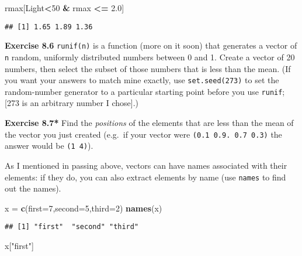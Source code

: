 \documentclass[11pt,]{article}
\newenvironment{Shaded}{\begin{snugshade}}{\end{snugshade}}
\newcommand{\KeywordTok}[1]{\textcolor[rgb]{0.13,0.29,0.53}{\textbf{#1}}}
\newcommand{\DataTypeTok}[1]{\textcolor[rgb]{0.13,0.29,0.53}{#1}}
\newcommand{\DecValTok}[1]{\textcolor[rgb]{0.00,0.00,0.81}{#1}}
\newcommand{\FloatTok}[1]{\textcolor[rgb]{0.00,0.00,0.81}{#1}}
\newcommand{\StringTok}[1]{\textcolor[rgb]{0.31,0.60,0.02}{#1}}
\newcommand{\OperatorTok}[1]{\textcolor[rgb]{0.81,0.36,0.00}{\textbf{#1}}}
\newcommand{\NormalTok}[1]{#1}
\begin{document}
\begin{Shaded}
\begin{Highlighting}[]
\NormalTok{rmax[Light}\OperatorTok{<}\DecValTok{50} \OperatorTok{&}\StringTok{ }\NormalTok{rmax }\OperatorTok{<=}\StringTok{ }\FloatTok{2.0}\NormalTok{]}
\end{Highlighting}
\end{Shaded}

\begin{verbatim}
## [1] 1.65 1.89 1.36
\end{verbatim}

\textbf{Exercise 8.6} \texttt{runif(n)} is a function (more on it soon)
that generates a vector of \texttt{n} random, uniformly distributed
numbers between 0 and 1. Create a vector of 20 numbers, then select the
subset of those numbers that is less than the mean. (If you want your
answers to match mine exactly, use \texttt{set.seed(273)} to set the
random-number generator to a particular starting point before you use
\texttt{runif}; {[}273 is an arbitrary number I chose{]}.)

\textbf{Exercise 8.7* } Find the \emph{positions} of the elements that
are less than the mean of the vector you just created (e.g.~if your
vector were \texttt{(0.1\ 0.9.\ 0.7\ 0.3)} the answer would be
\texttt{(1\ 4)}).

As I mentioned in passing above, vectors can have names associated with
their elements: if they do, you can also extract elements by name (use
\texttt{names} to find out the names).

\begin{Shaded}
\begin{Highlighting}[]
\NormalTok{x =}\StringTok{ }\KeywordTok{c}\NormalTok{(}\DataTypeTok{first=}\DecValTok{7}\NormalTok{,}\DataTypeTok{second=}\DecValTok{5}\NormalTok{,}\DataTypeTok{third=}\DecValTok{2}\NormalTok{)}
\KeywordTok{names}\NormalTok{(x)}
\end{Highlighting}
\end{Shaded}

\begin{verbatim}
## [1] "first"  "second" "third"
\end{verbatim}

\begin{Shaded}
\begin{Highlighting}[]
\NormalTok{x[}\StringTok{"first"}\NormalTok{]}
\end{Highlighting}
\end{Shaded}
\end{document}
